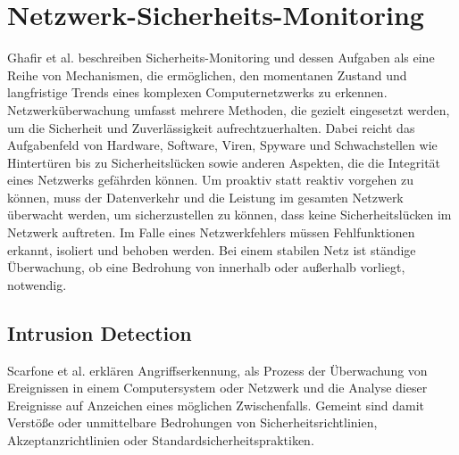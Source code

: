 \section{Netzwerk-Sicherheits-Monitoring}
Ghafir et al. \cite{ghafir_network_2015} beschreiben Sicherheits-Monitoring und dessen Aufgaben als eine Reihe von Mechanismen, die ermöglichen, den momentanen Zustand und langfristige Trends eines komplexen Computernetzwerks zu erkennen. Netzwerküberwachung umfasst mehrere Methoden, die gezielt eingesetzt werden, um die Sicherheit und Zuverlässigkeit aufrechtzuerhalten. Dabei reicht das Aufgabenfeld von Hardware, Software, Viren, Spyware und Schwachstellen wie Hintertüren bis zu Sicherheitslücken sowie anderen Aspekten, die die Integrität eines Netzwerks gefährden können. Um proaktiv statt reaktiv vorgehen zu können, muss der Datenverkehr und die Leistung im gesamten Netzwerk überwacht werden, um sicherzustellen zu können, dass keine Sicherheitslücken im Netzwerk auftreten. Im Falle eines Netzwerkfehlers müssen Fehlfunktionen erkannt, isoliert und behoben werden. Bei einem stabilen Netz ist ständige Überwachung, ob eine Bedrohung von innerhalb oder außerhalb vorliegt, notwendig.
\subsection{Intrusion Detection}
Scarfone et al. \cite{scarfone2007guide} erklären Angriffserkennung, als Prozess der Überwachung von Ereignissen in einem Computersystem oder Netzwerk und die Analyse dieser Ereignisse auf Anzeichen eines möglichen Zwischenfalls. Gemeint sind damit Verstöße oder unmittelbare Bedrohungen von Sicherheitsrichtlinien, Akzeptanzrichtlinien oder Standardsicherheitspraktiken.
